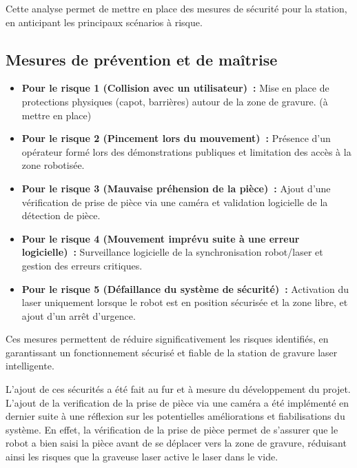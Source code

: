 Cette analyse permet de mettre en place des mesures de sécurité pour la station, en anticipant les principaux scénarios à risque.

\subsection{Mesures de prévention et de maîtrise}
\begin{itemize}
    \item \textbf{Pour le risque 1 (Collision avec un utilisateur)~:} Mise en place de protections physiques (capot, barrières) autour de la zone de gravure. (à mettre en place)
    \item \textbf{Pour le risque 2 (Pincement lors du mouvement)~:} Présence d'un opérateur formé lors des démonstrations publiques et limitation des accès à la zone robotisée.
    \item \textbf{Pour le risque 3 (Mauvaise préhension de la pièce)~:} Ajout d'une vérification de prise de pièce via une caméra et validation logicielle de la détection de pièce.
    \item \textbf{Pour le risque 4 (Mouvement imprévu suite à une erreur logicielle)~:} Surveillance logicielle de la synchronisation robot/laser et gestion des erreurs critiques.
    \item \textbf{Pour le risque 5 (Défaillance du système de sécurité)~:} Activation du laser uniquement lorsque le robot est en position sécurisée et la zone libre, et ajout d'un arrêt d'urgence.
\end{itemize}

Ces mesures permettent de réduire significativement les risques identifiés, en garantissant un fonctionnement sécurisé et fiable de la station de gravure laser intelligente.

L'ajout de ces sécurités a été fait au fur et à mesure du développement du projet. L'ajout de la verification de la prise de pièce via une caméra a été implémenté en dernier suite à une réflexion sur les potentielles améliorations et fiabilisations du système. En effet, la vérification de la prise de pièce permet de s'assurer que le robot a bien saisi la pièce avant de se déplacer vers la zone de gravure, réduisant ainsi les risques que la graveuse laser active le laser dans le vide.
